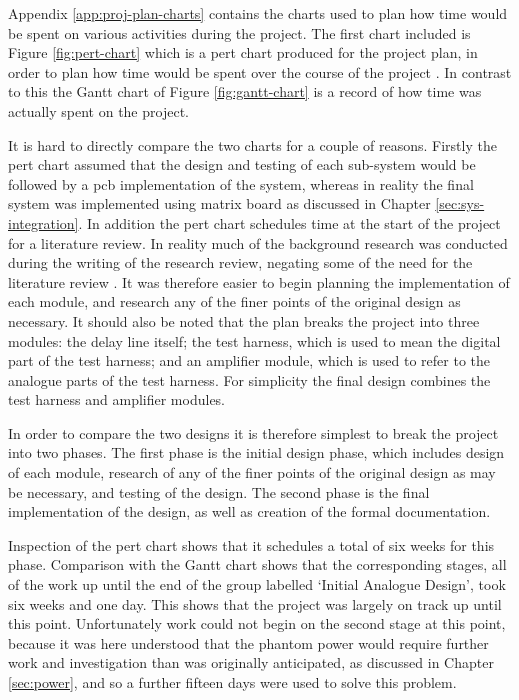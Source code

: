 Appendix \ref{app:proj-plan-charts} contains the charts used to plan how time would be spent on various activities during the project. The first chart included is Figure \ref{fig:pert-chart} which is a \gls{pert} chart produced for the project plan, in order to plan how time would be spent over the course of the project \cite[p.3]{tyler2017b}. In contrast to this the Gantt chart of Figure \ref{fig:gantt-chart} is a record of how time was actually spent on the project.

It is hard to directly compare the two charts for a couple of reasons. Firstly the \gls{pert} chart assumed that the design and testing of each sub-system would be followed by a \gls{pcb} implementation of the system, whereas in reality the final system was implemented using matrix board as discussed in Chapter \ref{sec:sys-integration}. In addition the \gls{pert} chart schedules time at the start of the project for a literature review. In reality much of the background research was conducted during the writing of the research review, negating some of the need for the literature review \cite{tyler2017}. It was therefore easier to begin planning the implementation of each module, and research any of the finer points of the original design as necessary. It should also be noted that the plan breaks the project into three modules: the delay line itself; the test harness, which is used to mean the digital part of the test harness; and an amplifier module, which is used to refer to the analogue parts of the test harness. For simplicity the final design combines the test harness and amplifier modules.

In order to compare the two designs it is therefore simplest to break the project into two phases. The first phase is the initial design phase, which includes design of each module, research of any of the finer points of the original design as may be necessary, and testing of the design. The second phase is the final implementation of the design, as well as creation of the formal documentation.

Inspection of the \gls{pert} chart shows that it schedules a total of six weeks for this phase. Comparison with the Gantt chart shows that the corresponding stages, all of the work up until the end of the group labelled `Initial Analogue Design', took six weeks and one day. This shows that the project was largely on track up until this point. Unfortunately work could not begin on the second stage at this point, because it was here understood that the phantom power would require further work and investigation than was originally anticipated, as discussed in Chapter \ref{sec:power}, and so a further fifteen days were used to solve this problem.

